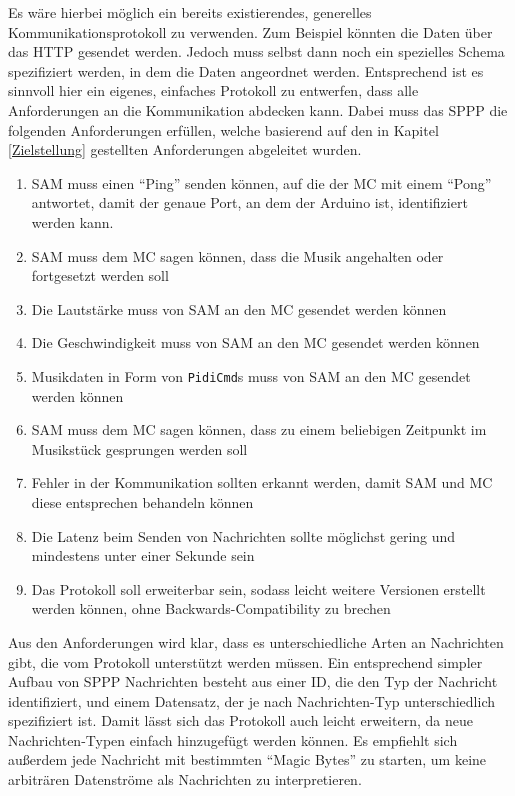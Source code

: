 Es wäre hierbei möglich ein bereits existierendes, generelles Kommunikationsprotokoll zu verwenden.
Zum Beispiel könnten die Daten über das \ac{HTTP} gesendet werden.
Jedoch muss selbst dann noch ein spezielles Schema spezifiziert werden, in dem die Daten angeordnet werden.
Entsprechend ist es sinnvoll hier ein eigenes, einfaches Protokoll zu entwerfen, dass alle Anforderungen an die Kommunikation abdecken kann.
Dabei muss das \ac{SPPP} die folgenden Anforderungen erfüllen, welche basierend auf den in Kapitel \ref{Zielstellung} gestellten Anforderungen abgeleitet wurden.

\begin{enumerate}
    \item \ac{SAM} muss einen \enquote{Ping} senden können, auf die der \ac{MC} mit einem \enquote{Pong} antwortet, damit der genaue Port, an dem der Arduino ist, identifiziert werden kann.
    \item \ac{SAM} muss dem \ac{MC} sagen können, dass die Musik angehalten oder fortgesetzt werden soll
    \item Die Lautstärke muss von \ac{SAM} an den \ac{MC} gesendet werden können
    \item Die Geschwindigkeit muss von \ac{SAM} an den \ac{MC} gesendet werden können
    \item Musikdaten in Form von \lstinline|PidiCmd|s muss von \ac{SAM} an den \ac{MC} gesendet werden können
    \item \ac{SAM} muss dem \ac{MC} sagen können, dass zu einem beliebigen Zeitpunkt im Musikstück gesprungen werden soll
    \item Fehler in der Kommunikation sollten erkannt werden, damit \ac{SAM} und \ac{MC} diese entsprechen behandeln können
    \item Die Latenz beim Senden von Nachrichten sollte möglichst gering und mindestens unter einer Sekunde sein
    \item Das Protokoll soll erweiterbar sein, sodass leicht weitere Versionen erstellt werden können, ohne Backwards-Compatibility zu brechen
\end{enumerate}

Aus den Anforderungen wird klar, dass es unterschiedliche Arten an Nachrichten gibt, die vom Protokoll unterstützt werden müssen.
Ein entsprechend simpler Aufbau von \ac{SPPP} Nachrichten besteht aus einer ID, die den Typ der Nachricht identifiziert, und einem Datensatz, der je nach Nachrichten-Typ unterschiedlich spezifiziert ist.
Damit lässt sich das Protokoll auch leicht erweitern, da neue Nachrichten-Typen einfach hinzugefügt werden können.
Es empfiehlt sich außerdem jede Nachricht mit bestimmten \enquote{Magic Bytes} zu starten, um keine arbiträren Datenströme als Nachrichten zu interpretieren.

